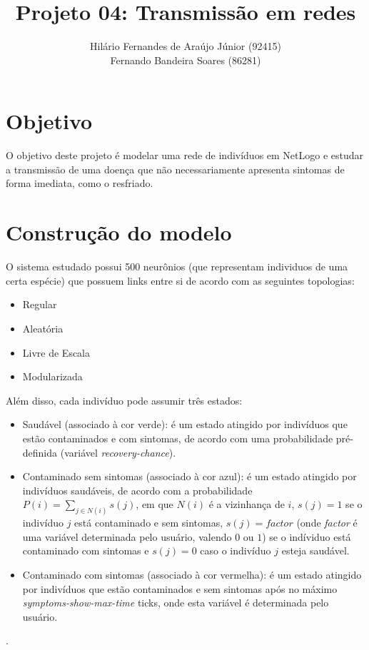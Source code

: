 \documentclass{article}
\title{ \bf   Projeto 04: Transmissão em redes}
\author{Hilário Fernandes de Araújo Júnior (92415)\\
Fernando Bandeira Soares (86281)
}
\begin{document}
\maketitle


\section{Objetivo}
O objetivo deste projeto é modelar uma rede de indivíduos em NetLogo e estudar a transmissão de uma doença que não necessariamente apresenta sintomas de forma imediata, como o resfriado.

\section{Construção do modelo}
O sistema estudado possui 500 neurônios (que representam individuos de uma certa espécie) que possuem links entre si de acordo com as seguintes topologias:

\begin{itemize}
\item Regular
\item Aleatória
\item Livre de Escala
\item Modularizada
\end{itemize}

Além disso, cada indivíduo pode assumir três estados: 

\begin{itemize}
\item Saudável (associado à cor verde): é um estado atingido por indivíduos que estão contaminados e com sintomas, de acordo com uma probabilidade pré-definida (variável \textit{recovery-chance}).
\item Contaminado sem sintomas (associado à cor azul): é um estado atingido por indivíduos saudáveis, de acordo com a probabilidade $P(i)=\sum_{j \in N(i)} s(j)$, em que $N(i)$ é a vizinhança de $i$, $s(j) = 1$ se o indivíduo $j$ está contaminado e sem sintomas, $s(j)=factor$ (onde \textit{factor} é uma variável determinada pelo usuário, valendo $0$ ou $1$) se o indíviduo está contaminado com sintomas e $s(j)=0$ caso o indivíduo $j$ esteja saudável.
\item Contaminado com sintomas (associado à cor vermelha): é um estado atingido por indivíduos que estão contaminados e sem sintomas após no máximo \textit{symptoms-show-max-time} ticks, onde esta variável é determinada pelo usuário.
\end{itemize}.
\end{document}
